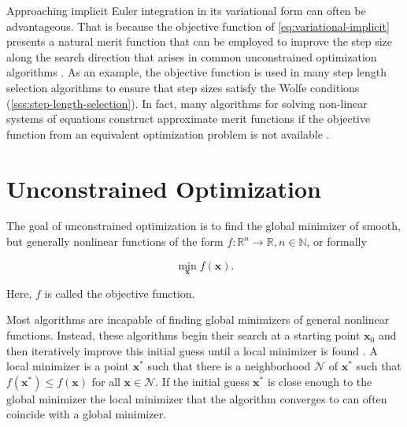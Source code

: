 Approaching implicit Euler integration in its variational form can often be advantageous. That is because the objective function of 
\cref{eq:variational-implicit} presents a natural merit function that can be employed to improve the step size along the search direction 
that arises in common unconstrained optimization algorithms \cite{nocedal2006}. As an example, the objective function is used in many step 
length selection algorithms to ensure that step sizes satisfy the Wolfe conditions (\cref{sss:step-length-selection}). In fact, many algorithms 
for solving non-linear systems of equations construct approximate merit functions if the objective function from an equivalent optimization
problem is not available \cite{nocedal2006}.

\section{Unconstrained Optimization}\label{s:unconstrained-optimization}
The goal of unconstrained optimization is to find the global minimizer of smooth, but generally nonlinear functions of the form $f \colon 
\mathbb{R}^n \to \mathbb{R}, n \in \mathbb{N}$, or formally

\[
    \min_{\bm{x}} f(\bm{x}).
\]

\noindent Here, $f$ is called the objective function. 

Most algorithms are incapable of finding global minimizers of general nonlinear functions. 
Instead, these algorithms begin their search at a starting point $\bm{x}_0$ and then iteratively improve this initial guess until a local 
minimizer is found \cite{nocedal2006}. A local minimizer is a point $\bm{x}^*$ such that there is a neighborhood $\mathcal{N}$ of 
$\bm{x}^*$ such that $f(\bm{x}^*) \leq f(\bm{x})$ for all $\bm{x} \in \mathcal{N}$. If the initial guess $\bm{x}^*$ is close enough 
to the global minimizer the local minimizer that the algorithm converges to can often coincide with a global minimizer. 

